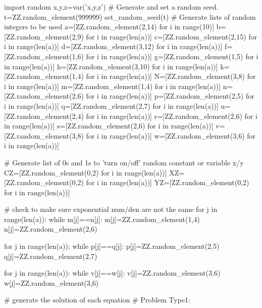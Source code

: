 \documentclass{article}%
\begin{document}
\begin{sagesilent}
import random
x,y,z=var('x,y,z')
# Generate and set a random seed.
t=ZZ.random_element(999999)
set_random_seed(t)
# Generate lists of random integers to be used
a=[ZZ.random_element(2,14) for i in range(10)]
b=[ZZ.random_element(2,9) for i in range(len(a))]
c=[ZZ.random_element(2,15) for i in range(len(a))]
d=[ZZ.random_element(3,12) for i in range(len(a))]
f=[ZZ.random_element(1,6) for i in range(len(a))]
g=[ZZ.random_element(1,5) for i in range(len(a))]
h=[ZZ.random_element(3,10) for i in range(len(a))]
k=[ZZ.random_element(1,4) for i in range(len(a))]
N=[ZZ.random_element(3,8) for i in range(len(a))]
m=[ZZ.random_element(1,4) for i in range(len(a))]
n=[ZZ.random_element(2,6) for i in range(len(a))]
p=[ZZ.random_element(2,5) for i in range(len(a))]
q=[ZZ.random_element(2,7) for i in range(len(a))]
u=[ZZ.random_element(2,4) for i in range(len(a))]
r=[ZZ.random_element(2,6) for i in range(len(a))]
s=[ZZ.random_element(2,6) for i in range(len(a))]
v=[ZZ.random_element(3,8) for i in range(len(a))]
w=[ZZ.random_element(3,6) for i in range(len(a))]


# Generate list of 0s and 1s to 'turn on/off' random constant or variable x/y
CZ=[ZZ.random_element(0,2) for i in range(len(a))]
XZ=[ZZ.random_element(0,2) for i in range(len(a))]
YZ=[ZZ.random_element(0,2) for i in range(len(a))]


# check to make sure exponential num/den are not the same
for j in range(len(a)):
  while m[j]==n[j]:
    m[j]=ZZ.random_element(1,4)
    n[j]=ZZ.random_element(2,6)

for j in range(len(a)):
  while p[j]==q[j]:
    p[j]=ZZ.random_element(2,5)
    q[j]=ZZ.random_element(2,7)
    
for j in range(len(a)):
  while v[j]==w[j]:
    v[j]=ZZ.random_element(3,6)
    w[j]=ZZ.random_element(3,6)   
    


# generate the solution of each equation
# Problem Type1: 
\end{sagesilent}
\end{document}
